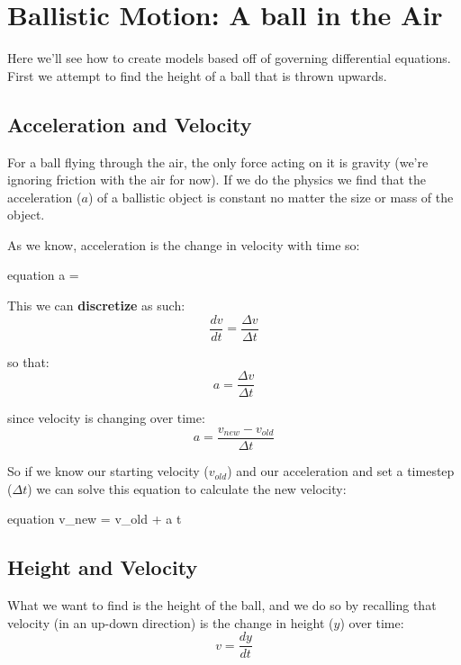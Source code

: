 \documentclass[11pt,fleqn]{book}
\begin{document}
\chapter{Ballistic Motion: A ball in the Air}

	Here we'll see how to create models based off of governing differential equations. First we attempt to find the height of a ball that is thrown upwards.
	
  \section{Acceleration and Velocity}
	For a ball flying through the air, the only force acting on it is gravity (we're ignoring friction with the air for now). If we do the physics we find that the acceleration ($a$) of a ballistic object is constant no matter the size or mass of the object.

	As we know, acceleration is the change in velocity with time so:
	\begin{empheq}[box=\fbox]{equation}
		a = 
	\end{empheq}

	This we can \textbf{discretize} as such:
	\begin{equation}
		\frac{dv}{dt} = \frac{\Delta v}{\Delta t}
	\end{equation}

	so that:
	\begin{equation}
	a = \frac{\Delta v}{\Delta t}
	\end{equation}

	since velocity is changing over time:
	\begin{equation}
		a = \frac{v_{new} - v_{old}}{\Delta t}
	\end{equation}

	So if we know our starting velocity ($v_{old}$) and our acceleration and set a timestep ($\Delta t$) we can solve this equation to calculate the new velocity:
	\begin{empheq}[box=\fbox]{equation}
		\label{eqn:v_new}
		v_{new} = v_{old} +  a \cdot \Delta t 
	\end{empheq}


  \section{Height and Velocity}
  	What we want to find is the height of the ball, and we do so by recalling that velocity (in an up-down direction) is the change in height ($y$) over time:
  	\begin{equation}
  		v = \frac{dy}{dt}
  	\end{equation}
  
\end{document}
